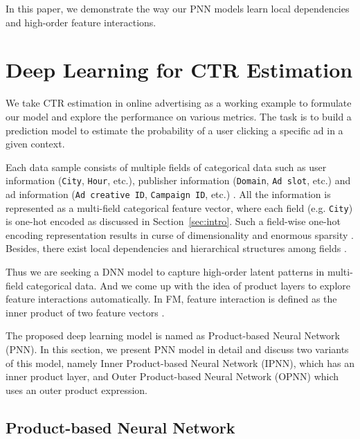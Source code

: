 \documentclass[conference]{IEEEtran}
\begin{document}
In this paper, we demonstrate the way our PNN models learn local dependencies and high-order feature interactions.


\section{Deep Learning for CTR Estimation}\label{sec:methodology}

We take CTR estimation in online advertising \cite{richardson2007predicting} as a working example to formulate our model and explore the performance on various metrics. The task is to build a prediction model to estimate the probability of a user clicking a specific ad in a given context.


Each data sample consists of multiple fields of categorical data such as user information (\texttt{City}, \texttt{Hour}, etc.), publisher information (\texttt{Domain}, \texttt{Ad slot}, etc.) and ad information (\texttt{Ad creative ID}, \texttt{Campaign ID}, etc.) \cite{zhang2014real}. All the information is represented as a multi-field categorical feature vector, where each field (e.g. \texttt{City}) is one-hot encoded as discussed in Section~\ref{sec:intro}.
Such a field-wise one-hot encoding representation results in curse of dimensionality and enormous sparsity \cite{zhang2016deep}. Besides, there exist local dependencies and hierarchical structures among fields \cite{menon2011response}.

Thus we are seeking a DNN model to capture high-order latent patterns in multi-field categorical data. And we come up with the idea of product layers to explore feature interactions automatically. In FM, feature interaction is defined as the inner product of two feature vectors \cite{rendle2010factorization}.

The proposed deep learning model is named as Product-based Neural Network (PNN). In this section, we present PNN model in detail and discuss two variants of this model, namely Inner Product-based Neural Network (IPNN), which has an inner product layer, and Outer Product-based Neural Network (OPNN) which uses an outer product expression.





\subsection{Product-based Neural Network}
\end{document}

